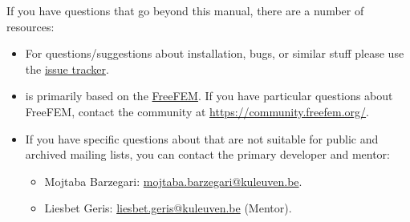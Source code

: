 If you have questions that go beyond this manual, there are a number of
resources:
\begin{itemize}
\item For questions/suggestions about \biodeg{} installation, bugs, or similar stuff please use the 
	\href{https://github.com/mbarzegary/BioDeg/issues}{\biodeg{} issue tracker}. 

\item \biodeg{} is primarily based on the \href{http://www.freefem.org/}{FreeFEM}. If you have particular questions about FreeFEM, contact the community at \url{https://community.freefem.org/}.

\item If you have specific questions about \biodeg{} that are not suitable
  for public and archived mailing lists, you can contact the
  primary developer and mentor:
  \begin{itemize}
  \item Mojtaba Barzegari: \url{mojtaba.barzegari@kuleuven.be}.
  \item Liesbet Geris: \url{liesbet.geris@kuleuven.be} (Mentor).
  \end{itemize}
\end{itemize}
